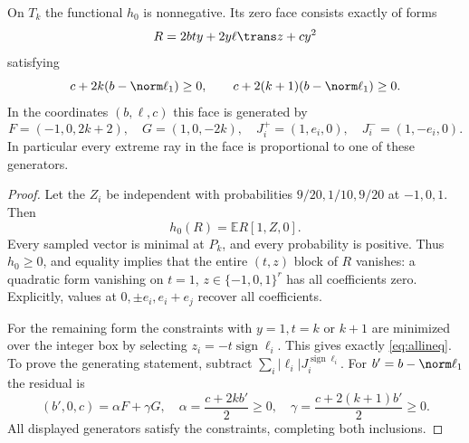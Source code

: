 \begin{lemma}\label{lem:allface}
On $T_k$ the functional $h_0$ is nonnegative. Its zero face consists exactly of forms
\[
 R=2bty+2y\ell\trans z+cy^2
\]
satisfying
\begin{equation}\label{eq:allineq}
 c+2k(b-\norm\ell_1)\ge0,\qquad
 c+2(k+1)(b-\norm\ell_1)\ge0.
\end{equation}
In the coordinates $(b,\ell,c)$ this face is generated by
\begin{equation}\label{eq:allgens}
 F=(-1,0,2k+2),\quad G=(1,0,-2k),\quad
 J_i^+=(1,e_i,0),\quad J_i^-=(1,-e_i,0).
\end{equation}
In particular every extreme ray in the face is proportional to one of these generators.
\end{lemma}
\begin{proof}
Let the $Z_i$ be independent with probabilities $9/20,1/10,9/20$ at $-1,0,1$. Then
\[
 h_0(R)=\mathbb E R[1,Z,0].
\]
Every sampled vector is minimal at $P_k$, and every probability is positive. Thus $h_0\ge0$, and equality implies that the entire $(t,z)$ block of $R$ vanishes: a quadratic form vanishing on $t=1$, $z\in\{-1,0,1\}^r$ has all coefficients zero. Explicitly, values at $0,\pm e_i,e_i+e_j$ recover all coefficients.

For the remaining form the constraints with $y=1,t=k$ or $k+1$ are minimized over the integer box by selecting $z_i=-t\operatorname{sign}\ell_i$. This gives exactly \eqref{eq:allineq}. To prove the generating statement, subtract $\sum_i|\ell_i|J_i^{\operatorname{sign}\ell_i}$. For $b'=b-\norm\ell_1$ the residual is
\[
 (b',0,c)=\alpha F+\gamma G,
 \quad \alpha=\frac{c+2kb'}2\ge0,
 \quad \gamma=\frac{c+2(k+1)b'}2\ge0.
\]
All displayed generators satisfy the constraints, completing both inclusions.
\end{proof}

